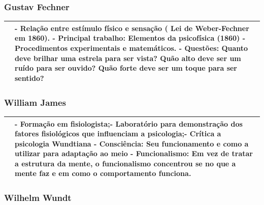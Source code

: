 \documentclass[
]{book}
\begin{document}
\hypertarget{gustav-fechner}{%
\subsubsection{Gustav Fechner}\label{gustav-fechner}}

\begin{longtable}[]{@{}
  >{\centering\arraybackslash}p{}
  >{\raggedright\arraybackslash}p{}@{}}
\toprule()
\endhead
& - Relação entre estímulo físico e sensação ( Lei de Weber-Fechner em 1860). - Principal trabalho: Elementos da psicofísica (1860) - Procedimentos experimentais e matemáticos. - Questões: Quanto deve brilhar uma estrela para ser vista? Quão alto deve ser um ruído para ser ouvido? Quão forte deve ser um toque para ser sentido? \\
\bottomrule()
\end{longtable}

\hypertarget{william-james}{%
\subsubsection{William James}\label{william-james}}

\begin{longtable}[]{@{}
  >{\centering\arraybackslash}p{}
  >{\raggedright\arraybackslash}p{}@{}}
\toprule()
\endhead
& - Formação em fisiologista;- Laboratório para demonstração dos fatores fisiológicos que influenciam a psicologia;- Crítica a psicologia Wundtiana - Consciência: Seu funcionamento e como a utilizar para adaptação ao meio - Funcionalismo: Em vez de tratar a \textbf{estrutura da mente}, o \textbf{funcionalismo concentrou} se \textbf{no que a mente faz} e em \textbf{como o comportamento funciona}. \\
\bottomrule()
\end{longtable}

\hypertarget{wilhelm-wundt}{%
\subsubsection{Wilhelm Wundt}\label{wilhelm-wundt}}
\end{document}
